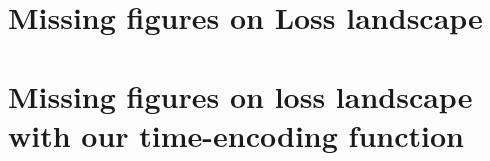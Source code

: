 \clearpage
\section{Missing figures on Loss landscape}\label{section:loss_landscape_appendix}



\clearpage


\clearpage


\clearpage


\clearpage


\clearpage


\clearpage
\section{Missing figures on loss landscape with our time-encoding function} \label{section:loss_landscape_appendix_fixed_time_encoder}


\clearpage


\clearpage


\clearpage